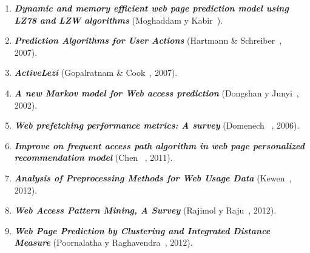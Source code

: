\vspace{1cm}


\begin{enumerate}

  \item \textbf{\emph{Dynamic and memory efficient web page prediction model using LZ78 and LZW algorithms}} (Moghaddam y Kabir~\cite{Moghaddam2009}). 


  \item \textbf{\emph{Prediction Algorithms for User Actions}} (Hartmann \& Schreiber~\cite{hartmann2007}, 2007). 
	
	
  \item \textbf{\emph{ActiveLezi}} (Gopalratnam  \& Cook~\cite{Gopalratnam2007}, 2007).  


  \item  \textbf{\emph{A new Markov model for Web access prediction}} (Dongshan y Junyi~\cite{Dongshan2002}, 2002). 
 
 
  \item \textbf{\emph{Web prefetching performance metrics: A survey}} (Domenech \etal~\cite{Domenech2006}, 2006). 
    
 
  \item \textbf{\emph{Improve on frequent access path algorithm in web page personalized recommendation model}} (Chen \etal~\cite{Chen2011}, 2011). 
  

  \item \textbf{\emph{Analysis of Preprocessing Methods for Web Usage Data}} (Kewen~\cite{kewen2012}, 2012). 


  \item \textbf{\emph{Web Access Pattern Mining, A Survey}} (Rajimol y Raju~\cite{Rajimol2012}, 2012). 
  

  \item \textbf{\emph{Web Page Prediction by Clustering and Integrated Distance Measure}} (Poornalatha y Raghavendra~\cite{Poornalatha2012}, 2012). 
  

  
\end{enumerate}




